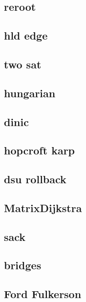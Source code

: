 \subsection{reroot}
\raggedbottom
\hrulefill
\subsection{hld edge}
\raggedbottom
\hrulefill
\subsection{two sat}
\raggedbottom
\hrulefill
\subsection{hungarian}
\raggedbottom
\hrulefill
\subsection{dinic}
\raggedbottom
\hrulefill
\subsection{hopcroft karp}
\raggedbottom
\hrulefill
\subsection{dsu rollback}
\raggedbottom
\hrulefill
\subsection{MatrixDijkstra}
\raggedbottom
\hrulefill
\subsection{sack}
\raggedbottom
\hrulefill
\subsection{bridges}
\raggedbottom
\hrulefill
\subsection{Ford Fulkerson}
\raggedbottom
\hrulefill

